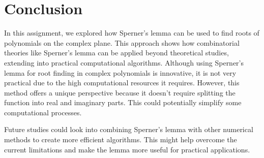 \documentclass[a4paper,12pt]{article}
\begin{document}
\section{Conclusion}

In this assignment, we explored how Sperner's lemma can be used to find roots of polynomials on the complex plane. 
This approach shows how combinatorial theories like Sperner's lemma can be applied beyond theoretical studies, 
extending into practical computational algorithms.
Although using Sperner's lemma for root finding in complex polynomials is innovative, 
it is not very practical due to the high computational resources it requires. 
However, this method offers a unique perspective because it doesn't require splitting the function into real and imaginary parts. 
This could potentially simplify some computational processes.

Future studies could look into combining Sperner's lemma with other numerical methods to create more efficient algorithms.
This might help overcome the current limitations and make the lemma more useful for practical applications.


  
  
\end{document}
